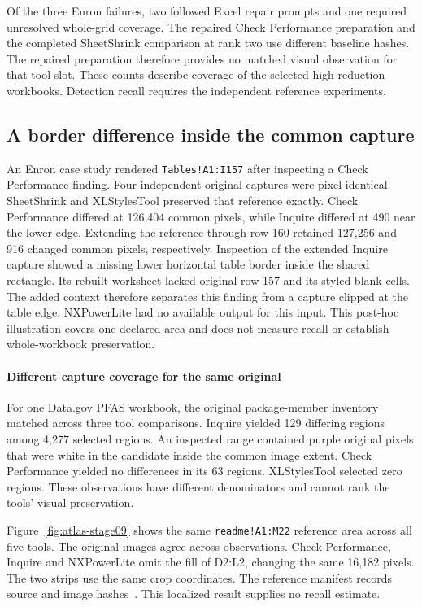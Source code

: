 Of the three Enron failures, two followed Excel repair prompts and one required unresolved
whole-grid coverage. The repaired Check Performance preparation and the
completed SheetShrink comparison at rank two use different baseline hashes.
The repaired preparation therefore provides no matched visual observation
for that tool slot. These counts describe coverage of the selected
high-reduction workbooks. Detection recall requires the independent reference
experiments.

\subsection{A border difference inside the common capture}
An Enron case study rendered \texttt{Tables!A1:I157}
after inspecting a Check Performance finding. Four independent original
captures were pixel-identical. SheetShrink and XLStylesTool preserved that
reference exactly. Check Performance differed at 126,404 common pixels, while
Inquire differed at 490 near the lower edge. Extending the reference through
row 160 retained 127,256 and 916 changed common pixels, respectively.
Inspection of the extended Inquire capture showed a missing lower horizontal
table border inside the shared rectangle. Its rebuilt worksheet lacked original
row 157 and its styled blank cells. The added context therefore separates this
finding from a capture clipped at the table edge. NXPowerLite had no available
output for this input. This post-hoc illustration covers one declared area and
does not measure recall or establish whole-workbook preservation.

\paragraph{Different capture coverage for the same original}
For one Data.gov PFAS workbook, the original package-member inventory
matched across three tool comparisons. Inquire yielded 129 differing
regions among 4,277 selected regions. An inspected range contained purple
original pixels that were white in the candidate inside the common image
extent. Check Performance yielded no differences in its 63 regions.
XLStylesTool selected zero regions. These observations have different
denominators and cannot rank the tools' visual preservation.

Figure~\ref{fig:atlas-stage09} shows the same \texttt{readme!A1:M22}
reference area across all five tools. The original images agree across
observations. Check Performance, Inquire and NXPowerLite omit the fill
of D2:L2, changing the same 16,182 pixels. The two strips use the same
crop coordinates. The reference manifest records source and image
hashes~\cite{adagefixedreference}. This localized result supplies no
recall estimate.

